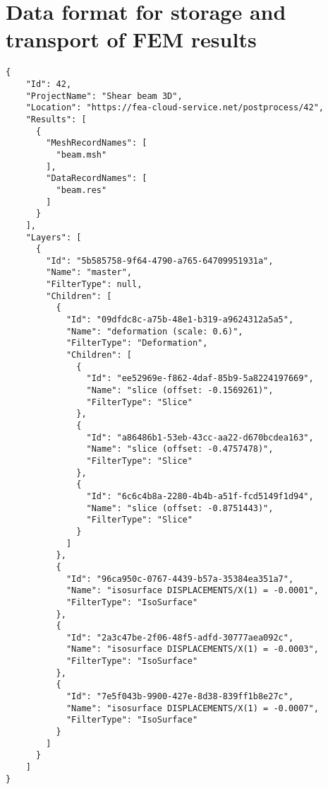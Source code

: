 \chapter{Data format for storage and transport of FEM results}
\label{appendix:data-format}


\begin{lstlisting}[style=json,caption=Example of solution.json document.,label=lst:solution.json]
{
    "Id": 42,
    "ProjectName": "Shear beam 3D",
    "Location": "https://fea-cloud-service.net/postprocess/42",
    "Results": [
      {
        "MeshRecordNames": [
          "beam.msh"
        ],
        "DataRecordNames": [
          "beam.res"
        ]
      }
    ],
    "Layers": [
      {
        "Id": "5b585758-9f64-4790-a765-64709951931a",
        "Name": "master",
        "FilterType": null,
        "Children": [
          {
            "Id": "09dfdc8c-a75b-48e1-b319-a9624312a5a5",
            "Name": "deformation (scale: 0.6)",
            "FilterType": "Deformation",
            "Children": [
              {
                "Id": "ee52969e-f862-4daf-85b9-5a8224197669",
                "Name": "slice (offset: -0.1569261)",
                "FilterType": "Slice"
              },
              {
                "Id": "a86486b1-53eb-43cc-aa22-d670bcdea163",
                "Name": "slice (offset: -0.4757478)",
                "FilterType": "Slice"
              },
              {
                "Id": "6c6c4b8a-2280-4b4b-a51f-fcd5149f1d94",
                "Name": "slice (offset: -0.8751443)",
                "FilterType": "Slice"
              }
            ]
          },
          {
            "Id": "96ca950c-0767-4439-b57a-35384ea351a7",
            "Name": "isosurface DISPLACEMENTS/X(1) = -0.0001",
            "FilterType": "IsoSurface"
          },
          {
            "Id": "2a3c47be-2f06-48f5-adfd-30777aea092c",
            "Name": "isosurface DISPLACEMENTS/X(1) = -0.0003",
            "FilterType": "IsoSurface"
          },
          {
            "Id": "7e5f043b-9900-427e-8d38-839ff1b8e27c",
            "Name": "isosurface DISPLACEMENTS/X(1) = -0.0007",
            "FilterType": "IsoSurface"
          }
        ]
      }
    ]
}
\end{lstlisting}

\pagebreak

